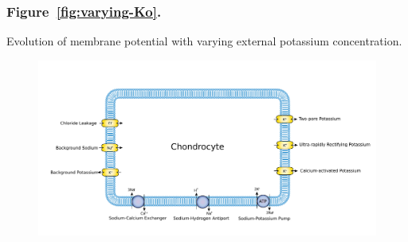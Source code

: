 \subsubsection*{Figure~\ref{fig:varying-Ko}.}
Evolution of membrane potential with varying external potassium
concentration.

\setlength{\textwidth}{18cm}
\setlength{\oddsidemargin}{0in}
\setlength{\evensidemargin}{0in}

\clearpage
\begin{landscape}
\begin{figure}
  \centering
  \includegraphics[width=\textwidth]
  {../images/pdf/chondrocyte-model-cellml}
  \caption{}
  \label{fig:chondrocyte-model}
\end{figure}
\end{landscape}

